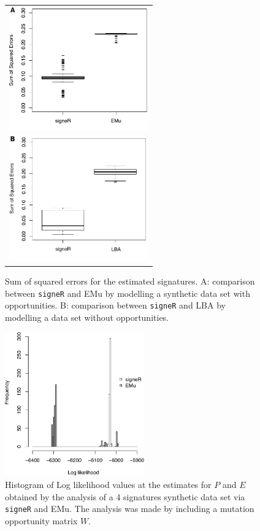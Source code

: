 \documentclass{bioinfo}
\begin{document}
\begin{figure}
 \centering
   \begin{tabular}{c}
 \includegraphics[width=6cm]{figs/Simulation_signeR_vs_EMu_boxplot_SSE_500sim}
   \\
 \includegraphics[width=6cm]{figs/Simulation_signeR_vs_Alex_boxplot_SSE_P}
   \end{tabular}
  \caption{\textrm{%
    Sum of squared errors for the estimated signatures. A:
    comparison between \texttt{signeR} and EMu by modelling a synthetic
    data set with opportunities. B: comparison between \texttt{signeR}
    and LBA by modelling a data set without opportunities.
   }
  }
  \label{fig:synth_SSE}
\end{figure}
\begin{figure}
 \centering
  \includegraphics[width=6cm]{figs/Simulation_signeR_vs_EMu_histogram_LLh_same_axis_500sim}
  \caption{\textrm{%
   Histogram of Log likelihood values at the estimates for $P$ and $E$
   obtained by the analysis of a 4 signatures synthetic data set via
   \texttt{signeR} and EMu. The analysis was made by including a
   mutation opportunity matrix $W$.
   }
  }
  \label{fig:synth_LLh}
\end{figure}
\end{document}
